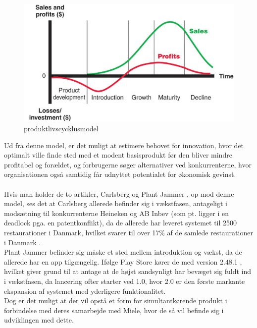 \begin{figure}[H]
    \includegraphics[width=\textwidth]{assets/Product-Life-Cycle-Stages.jpg}
    \caption{produktlivscycklusmodel \cite{plcpic}}
    \label{livscyklusmodel}
\end{figure}
\noindent
Ud fra denne model, er det muligt at estimere behovet for innovation, hvor det optimalt ville finde sted med et modent basisprodukt før den bliver mindre profitabel og forældet,
og forbrugerne søger alternativer ved konkurrenterne, hvor organisationen også samtidig får udnyttet potentialet for økonomisk gevinst.
\\~\\Hvis man holder de to artikler, Carlsberg og Plant Jammer \cite[a.2, a.3]{eksamensopgave}, op mod denne model, ses det at Carlsberg allerede befinder sig i vækstfasen,
antageligt i modsætning til konkurrenterne Heineken og AB Inbev (som pt. ligger i en deadlock pga. en patentkonflikt), da de allerede har leveret systemet til 2500 restaurationer i Danmark, hvilket svarer til over 17\% af de samlede restaurationer i Danmark \cite{restaurantstat}.
\\Plant Jammer befinder sig måske et sted mellem introduktion og vækst, da de allerede har en app tilgængelig. Ifølge Play Store kører de med version 2.48.1 \cite{plantplay}, hvilket giver grund til at antage at de højst sandsynligt har bevæget sig fuldt ind i vækstfasen, da lancering ofter starter ved 1.0, hvor 2.0 er den første markante ekspansion af systemet med yderligere funktionalitet.
\\Dog er det muligt at der vil opstå et form for simultantkørende produkt i forbindelse med deres samarbejde med Miele, hvor de så vil befinde sig i udviklingen med dette.
